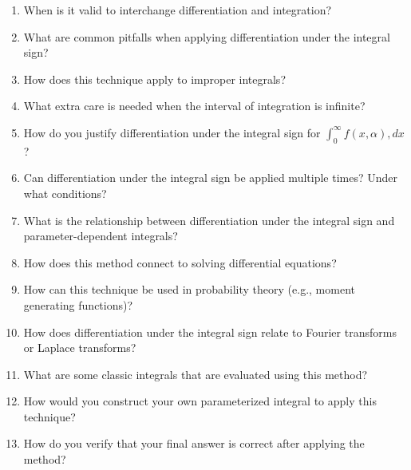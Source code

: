 \begin{enumerate}
  \item When is it valid to interchange differentiation and integration?
  \item What are common pitfalls when applying differentiation under the integral sign?
  \item How does this technique apply to improper integrals?
  \item What extra care is needed when the interval of integration is infinite?
  \item How do you justify differentiation under the integral sign for $\int_0^\infty f(x,\alpha),dx$?
  \item Can differentiation under the integral sign be applied multiple times? Under what conditions?
  \item What is the relationship between differentiation under the integral sign and parameter-dependent integrals?
  \item How does this method connect to solving differential equations?
  \item How can this technique be used in probability theory (e.g., moment generating functions)?
  \item How does differentiation under the integral sign relate to Fourier transforms or Laplace transforms?
  \item What are some classic integrals that are evaluated using this method?
  \item How would you construct your own parameterized integral to apply this technique?
  \item How do you verify that your final answer is correct after applying the method?
\end{enumerate}
